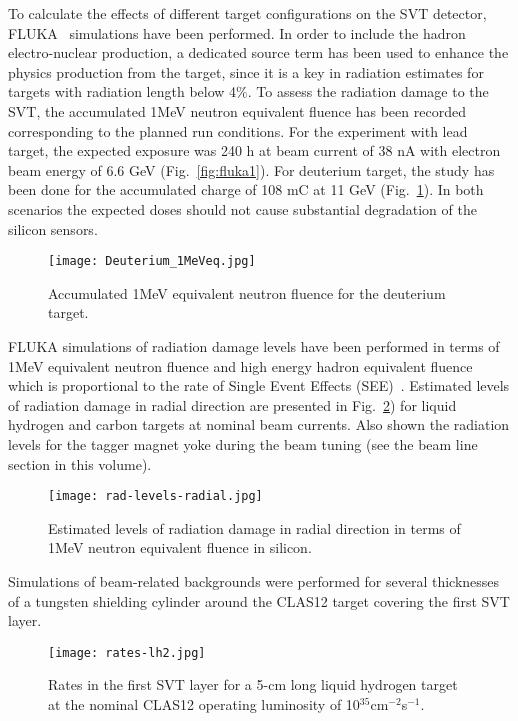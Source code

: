 To calculate the effects of different target configurations on the SVT detector,  FLUKA~\cite{FLUKA1, FLUKA2} simulations have been performed. In order to include the hadron electro-nuclear production, a dedicated source term has been used to enhance the physics production from the target, since it is a key in radiation estimates for targets with radiation length below 4$\%$. To assess the radiation damage to the SVT, the accumulated 1MeV neutron equivalent fluence has been recorded corresponding to the planned run conditions. For the experiment with lead target, the expected exposure was 240 h at beam current of 38 nA with electron beam energy of 6.6 GeV (Fig.~\ref{fig:fluka1}). For deuterium target, the study has been done for the accumulated charge of 108 mC at 11 GeV (Fig.~\ref{fig:fluka2}). In both scenarios the expected doses should not cause substantial degradation of the silicon sensors.

\begin{figure}[hbt] 
\centering 
\texttt{[image: Deuterium\_1MeVeq.jpg]}
\caption{Accumulated 1MeV equivalent neutron fluence for the deuterium target.}
\label{fig:fluka2}
\end{figure}

FLUKA simulations of radiation damage levels have been performed in terms of 1MeV equivalent neutron fluence and high energy hadron equivalent fluence which is proportional to the rate of Single Event Effects (SEE)~\cite{FLUKA3}. Estimated levels of radiation damage in radial direction are presented in Fig.~\ref{fig:rad-levels-radial}) for liquid hydrogen and carbon targets at nominal beam currents. Also shown the radiation levels for the tagger magnet yoke during the beam tuning (see the beam line section in this volume).

\begin{figure}[hbt] 
\centering 
\texttt{[image: rad-levels-radial.jpg]}
\caption{Estimated levels of radiation damage in radial direction in terms of 1MeV neutron equivalent fluence in silicon.}
\label{fig:rad-levels-radial}
\end{figure}

Simulations of beam-related backgrounds were performed for several thicknesses of a tungsten shielding cylinder around the CLAS12 target covering the first SVT layer. 
 
\begin{figure}[hbt] 
\centering 
\texttt{[image: rates-lh2.jpg]}
\caption{Rates in the first SVT layer for a 5-cm long liquid hydrogen target at the nominal CLAS12 operating luminosity of 10$^{35}$cm$^{-2}$s$^{-1}$.}
\label{fig:rates-lh2}
\end{figure}

